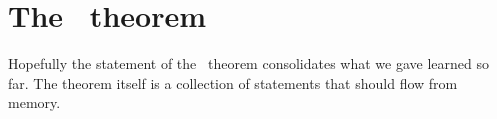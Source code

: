 \chapter[The SVD theorem]{The \svdl \ theorem}
Hopefully the statement of the \svdl \ theorem consolidates what we gave learned so far. The theorem itself is a collection of statements that should flow from memory. 








\endinput
